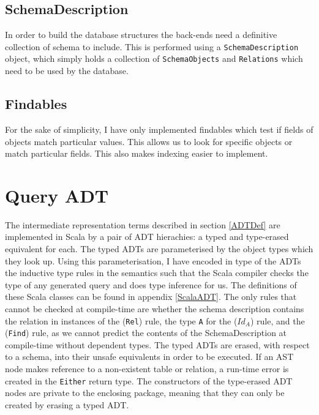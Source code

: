 \documentclass[12pt,a4paper,twoside,openright]{report}
\newcommand\codeName[1]{\texttt{#1}}
\begin{document}
	
	\subsection{SchemaDescription}
	
In order to build the database structures the back-ends need a definitive collection of schema to include. This is performed using a \codeName{SchemaDescription} object, which simply holds a collection of \codeName{SchemaObjects} and \codeName{Relations} which need to be used by the database.	
	
	\subsection{Findables}
	For the sake of simplicity, I have only implemented findables which test if fields of objects match particular values. This allows us to look for specific objects or match particular fields. This also makes indexing easier to implement.
	
\section{Query ADT}
The intermediate representation terms described in  section \ref{ADTDef} are implemented in Scala by a pair of ADT hierachies: a typed and type-erased equivalent for each. The typed ADTs are parameterised by the object types which they look up. Using this parameterisation, I have encoded in type of the ADTs the inductive type rules in the semantics such that the Scala compiler checks the type of any generated query and does type inference for us. The definitions of these Scala classes can be found in appendix \ref{ScalaADT}. The only rules that cannot be checked at compile-time are whether the schema description contains the relation in instances of the (\codeName{Rel}) rule, the type \codeName{A} for the (\codeName{$Id_A$}) rule, and the (\codeName{Find}) rule, as we cannot predict the contents of the SchemaDescription at compile-time without dependent types.  The typed ADTs are erased, with respect to a schema,  into their unsafe equivalents in order to be executed. If an AST node makes reference to a non-existent table or relation, a run-time error is created in the \codeName{Either} return type. The constructors of the type-erased ADT nodes are private to the enclosing package, meaning that they can only be created by erasing a typed ADT.
	
\end{document}
